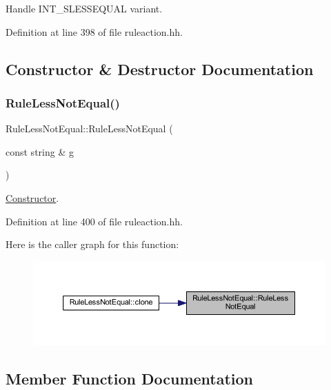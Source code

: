 Handle I\+N\+T\+\_\+\+S\+L\+E\+S\+S\+E\+Q\+U\+AL variant. 

Definition at line 398 of file ruleaction.\+hh.



\subsection{Constructor \& Destructor Documentation}
\mbox{\label{class_rule_less_not_equal_a8e3e35af93a2ac716ea10aa2381ec8d6}} 
\subsubsection{\texorpdfstring{RuleLessNotEqual()}{RuleLessNotEqual()}}
{\footnotesize\ttfamily Rule\+Less\+Not\+Equal\+::\+Rule\+Less\+Not\+Equal (\begin{DoxyParamCaption}\item[{const string \&}]{g }\end{DoxyParamCaption})\hspace{0.3cm}{\ttfamily [inline]}}



\mbox{\hyperlink{class_constructor}{Constructor}}. 



Definition at line 400 of file ruleaction.\+hh.

Here is the caller graph for this function\+:
\nopagebreak
\begin{figure}[H]
\begin{center}
\leavevmode
\includegraphics[width=350pt]{class_rule_less_not_equal_a8e3e35af93a2ac716ea10aa2381ec8d6_icgraph}
\end{center}
\end{figure}


\subsection{Member Function Documentation}
\mbox{\label{class_rule_less_not_equal_a08fa964bfe43c6783d801d5c33d46d7a}} 
